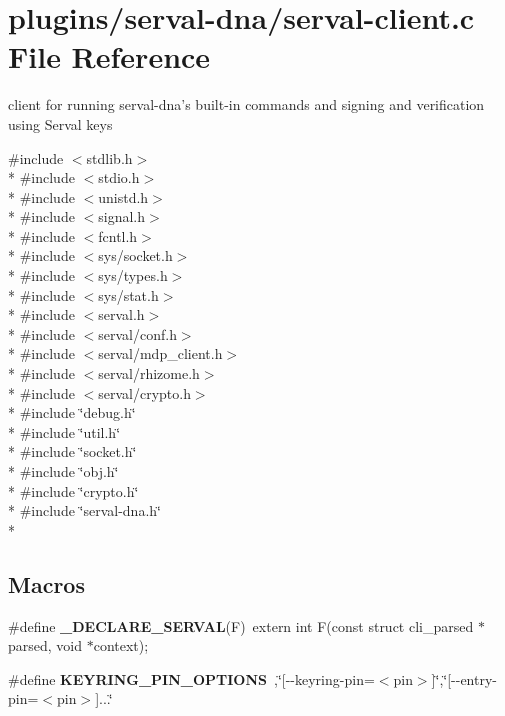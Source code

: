 \hypertarget{serval-client_8c}{\section{plugins/serval-\/dna/serval-\/client.c File Reference}
\label{serval-client_8c}
}


client for running serval-\/dna's built-\/in commands and signing and verification using Serval keys  


{\ttfamily \#include $<$stdlib.\-h$>$}\\*
{\ttfamily \#include $<$stdio.\-h$>$}\\*
{\ttfamily \#include $<$unistd.\-h$>$}\\*
{\ttfamily \#include $<$signal.\-h$>$}\\*
{\ttfamily \#include $<$fcntl.\-h$>$}\\*
{\ttfamily \#include $<$sys/socket.\-h$>$}\\*
{\ttfamily \#include $<$sys/types.\-h$>$}\\*
{\ttfamily \#include $<$sys/stat.\-h$>$}\\*
{\ttfamily \#include $<$serval.\-h$>$}\\*
{\ttfamily \#include $<$serval/conf.\-h$>$}\\*
{\ttfamily \#include $<$serval/mdp\-\_\-client.\-h$>$}\\*
{\ttfamily \#include $<$serval/rhizome.\-h$>$}\\*
{\ttfamily \#include $<$serval/crypto.\-h$>$}\\*
{\ttfamily \#include \char`\"{}debug.\-h\char`\"{}}\\*
{\ttfamily \#include \char`\"{}util.\-h\char`\"{}}\\*
{\ttfamily \#include \char`\"{}socket.\-h\char`\"{}}\\*
{\ttfamily \#include \char`\"{}obj.\-h\char`\"{}}\\*
{\ttfamily \#include \char`\"{}crypto.\-h\char`\"{}}\\*
{\ttfamily \#include \char`\"{}serval-\/dna.\-h\char`\"{}}\\*
\subsection*{Macros}
\begin{DoxyCompactItemize}
\item 
\hypertarget{serval-client_8c_ab0fc78ef17e183991c792dd29b73586b}{\#define {\bfseries \-\_\-\-D\-E\-C\-L\-A\-R\-E\-\_\-\-S\-E\-R\-V\-A\-L}(F)~extern int F(const struct cli\-\_\-parsed $\ast$parsed, void $\ast$context);}\label{serval-client_8c_ab0fc78ef17e183991c792dd29b73586b}

\item 
\hypertarget{serval-client_8c_a6673788ba40e8532353e55a1adb39166}{\#define {\bfseries K\-E\-Y\-R\-I\-N\-G\-\_\-\-P\-I\-N\-\_\-\-O\-P\-T\-I\-O\-N\-S}~,\char`\"{}\mbox{[}-\/-\/keyring-\/pin=$<$pin$>$\mbox{]}\char`\"{},\char`\"{}\mbox{[}-\/-\/entry-\/pin=$<$pin$>$\mbox{]}...\char`\"{}}\label{serval-client_8c_a6673788ba40e8532353e55a1adb39166}

\end{DoxyCompactItemize}
